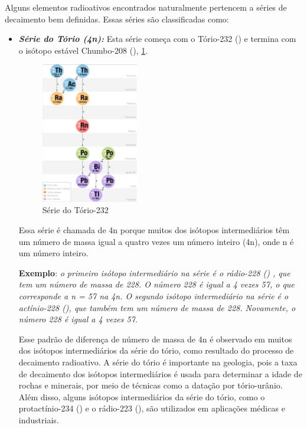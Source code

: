 \documentclass[11pt,a4paper]{article}
\begin{document}
                Alguns elementos radioativos encontrados naturalmente pertencem a séries de decaimento bem definidas. Essas séries são classificadas como:
                
                

                \begin{itemize}
                    \item \textbf{\textit{\textcolor{CarnationPink}{Série do Tório (4n):}}} Esta série começa com o Tório-232 () e termina com o isótopo estável Chumbo-208 (), \ref{fig:serieDoTorio}.

                    \begin{figure}[h]
                        \centering
                        \includegraphics[width=0.4\textwidth]{Imagens/serieDoTorio.jpg}
                        \caption{Série do Tório-232}
                        \label{fig:serieDoTorio}
                    \end{figure}

                    Essa série é chamada de 4n porque muitos dos isótopos intermediários têm um número de massa igual a quatro vezes um número inteiro (4n), onde n é um número inteiro.

                        \textbf{Exemplo}: \textit{o primeiro isótopo intermediário na série é o rádio-228 () , que tem um número de massa de 228. O número 228 é igual a 4 vezes 57, o que corresponde a n = 57 na  4n. O segundo isótopo intermediário na série é o actínio-228 (), que também tem um número de massa de 228. Novamente, o número 228 é igual a 4 vezes 57.}

                        Esse padrão de diferença de número de massa de 4n é observado em muitos dos isótopos intermediários da série do tório, como resultado do processo de decaimento radioativo. A série do tório é importante na geologia, pois a taxa de decaimento dos isótopos intermediários é usada para determinar a idade de rochas e minerais, por meio de técnicas como a datação por tório-urânio. Além disso, alguns isótopos intermediários da série do tório, como o protactínio-234 () e o rádio-223 (), são utilizados em aplicações médicas e industriais.


\end{itemize}
\end{document}

